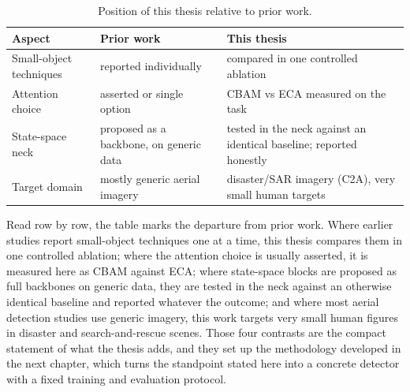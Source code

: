 \begin{table}[H]
  \centering
  \caption{Position of this thesis relative to prior work.}
  \label{tab:gap}
  \small
  \setlength{\tabcolsep}{5pt}
  \renewcommand{\arraystretch}{1.15}
  \begin{tabular}{@{}p{3.8cm} p{4.7cm} p{4.7cm}@{}}
    \toprule
    Aspect & Prior work & This thesis \\
    \midrule
    Small-object techniques & reported individually & compared in one controlled ablation \\
    Attention choice & asserted or single option & CBAM vs ECA measured on the task \\
    State-space neck & proposed as a backbone, on generic data & tested in the neck against an identical baseline; reported honestly \\
    Target domain & mostly generic aerial imagery & disaster/SAR imagery (C2A), very small human targets \\
    \bottomrule
  \end{tabular}
\end{table}

Read row by row, the table marks the departure from prior work. Where earlier
studies report small-object techniques one at a time, this thesis compares them
in one controlled ablation; where the attention choice is usually asserted, it
is measured here as CBAM against ECA; where state-space blocks are proposed as
full backbones on generic data, they are tested in the neck against an
otherwise identical baseline and reported whatever the outcome; and where most
aerial detection studies use generic imagery, this work targets very small
human figures in disaster and search-and-rescue scenes. Those four contrasts
are the compact statement of what the thesis adds, and they set up the
methodology developed in the next chapter, which turns the standpoint stated
here into a concrete detector with a fixed training and evaluation protocol.
